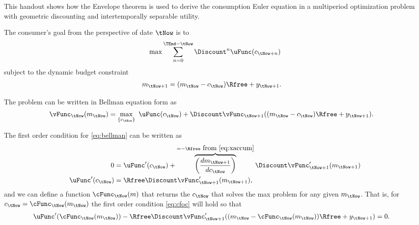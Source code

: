This handout shows how the Envelope theorem is used to derive the
consumption Euler equation in a multiperiod optimization problem with
geometric discounting and intertemporally separable utility.

The consumer's goal from the perspective of date $\tNow$ is to 
\begin{equation}
        \max \sum_{n=0}^{\TEnd-\tNow} \Discount^{n} \uFunc(c_{\tNow+n})
\end{equation}
subject to the dynamic budget constraint
\begin{equation}\begin{gathered}\begin{aligned}
 {m}_{\tNow+1} & =  ({m}_{\tNow}-{c}_{\tNow})\Rfree + {y}_{\tNow+1}. \label{eq:xaccum}
\end{aligned}\end{gathered}\end{equation}

The problem can be written in Bellman equation form as
\begin{equation}\begin{gathered}\begin{aligned}
        \vFunc_{\tNow}({m}_{\tNow}) & =  \max_{\{{c}_{\tNow}\}} ~\uFunc({c}_{\tNow}) + \Discount \vFunc_{\tNow+1}(({m}_{\tNow}-{c}_{\tNow})\Rfree+{y}_{\tNow+1}). \label{eq:bellman}
\end{aligned}\end{gathered}\end{equation}

The first order condition for \eqref{eq:bellman} can be written
as
\begin{equation}\begin{gathered}\begin{aligned}
        0 & =
        \uFunc^{\prime}({c}_{\tNow})+\overbrace{\left(\frac{d {m}_{\tNow+1}}{d {c}_{\tNow}}\right)}^{=-\Rfree~\mbox{from \eqref{eq:xaccum}}}
        \Discount \vFunc_{\tNow+1}^{\prime}({m}_{\tNow+1})
\\  \uFunc^{\prime}({c}_{\tNow}) & =  \Rfree \Discount \vFunc_{\tNow+1}^{\prime}({m}_{\tNow+1}), \label{eq:cfoc}
\end{aligned}\end{gathered}\end{equation}
and we can define a function $\cFunc_{\tNow}({m})$ that returns the
${c}_{\tNow}$ that solves the max problem for any given ${m}_{\tNow}$.  That is,
for ${c}_{\tNow}=\cFunc_{\tNow}({m}_{\tNow})$ the first order condition \eqref{eq:cfoc}
will hold so that
\begin{equation}\begin{gathered}\begin{aligned}
        \uFunc^{\prime}(\cFunc_{\tNow}({m}_{\tNow})) - \Rfree \Discount \vFunc_{\tNow+1}^{\prime}(({m}_{\tNow}-\cFunc_{\tNow}({m}_{\tNow}))\Rfree+{y}_{\tNow+1}) & =  0. \label{eq:cstarfoc}
\end{aligned}\end{gathered}\end{equation}

